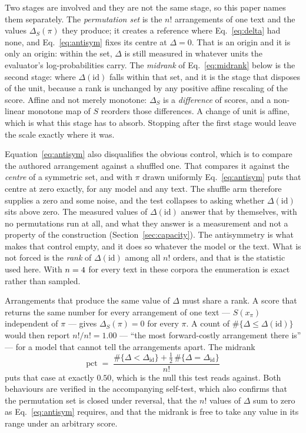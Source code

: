 \documentclass[11pt]{article}
\begin{document}
Two stages are involved and they are not the same stage, so this paper names
them separately.  The \emph{permutation set} is the $n!$ arrangements of one
text and the values $\Delta_S(\pi)$ they produce; it creates a reference where
Eq.~\eqref{eq:delta} had none, and Eq.~\eqref{eq:antisym} fixes its centre at
$\Delta = 0$.  That is an origin and it is only an origin: within the set,
$\Delta$ is still measured in whatever units the evaluator's
log-probabilities carry.  The \emph{midrank} of
Eq.~\eqref{eq:midrank} below is the second stage: where $\Delta(\mathrm{id})$ falls within that set, and it is the stage that disposes of the unit, because a rank is unchanged by any positive affine rescaling of
the score.  Affine and not merely monotone: $\Delta_S$ is a
\emph{difference} of scores, and a non-linear monotone map of $S$
reorders those differences.  A change of unit is affine, which is what
this stage has to absorb.  Stopping after the first stage would leave the
scale exactly where it was.

Equation~\eqref{eq:antisym} also disqualifies the obvious control, which is
to compare the authored arrangement against a shuffled one.  That compares
it against the \emph{centre} of a symmetric set, and with $\pi$ drawn
uniformly Eq.~\eqref{eq:antisym} puts that centre at zero exactly, for any
model and any text.  The shuffle arm therefore supplies a zero and some
noise, and the test collapses to asking whether $\Delta(\mathrm{id})$ sits
above zero.  The measured values of $\Delta(\mathrm{id})$ answer that by
themselves, with no permutations run at all, and what they answer is a
measurement and not a property of the construction
(Section~\ref{sec:capacity}).  The antisymmetry is what makes that control
empty, and it does so whatever the model or the text.  What is not forced
is the \emph{rank} of $\Delta(\mathrm{id})$ among all $n!$ orders, and that is
the statistic used here.  With $n = 4$ for every text in these corpora the
enumeration is exact rather than sampled.

Arrangements that produce the same value of $\Delta$ must share a rank.  A
score that returns the same number for every arrangement of one text ---
$S(x_\pi)$ independent of $\pi$ --- gives $\Delta_S(\pi) = 0$ for every
$\pi$.  A count of
$\#\{\Delta \le \Delta(\mathrm{id})\}$ would then report $n!/n! = 1.00$ ---
``the most forward-costly arrangement there is'' --- for a model that cannot
tell the arrangements apart.  The midrank
\begin{equation}
\mathrm{pct} \;=\;
\frac{\#\{\Delta < \Delta_{\mathrm{id}}\}
      + \tfrac{1}{2}\,\#\{\Delta = \Delta_{\mathrm{id}}\}}{n!}
\label{eq:midrank}
\end{equation}
puts that case at exactly $0.50$, which is the null this test reads against.
Both behaviours are verified in the accompanying self-test, which also confirms
that the permutation set is closed under reversal, that the $n!$ values of
$\Delta$ sum to zero as Eq.~\eqref{eq:antisym} requires, and that the midrank
is free to take any value in its range under an arbitrary score.
\end{document}
